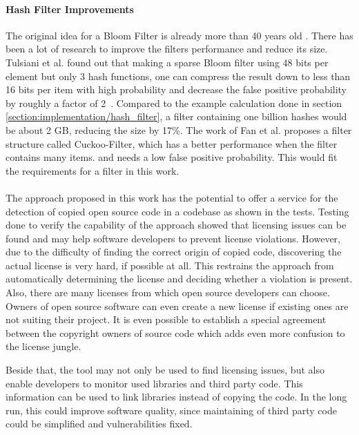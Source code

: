 \paragraph{Hash Filter Improvements}
The original idea for a Bloom Filter is already more than 40 years old \cite{bloom1970filter}.
There has been a lot of research to improve the filters performance and reduce its size.
Tulsiani et al. found out that \glqq making a sparse Bloom filter using 48 bits per element but only 3 hash functions, one can compress the result down to less than 16 bits per item with high probability and decrease the false positive probability by roughly a factor of 2\grqq \ \cite{tulsiani2013probability}.
Compared to the example calculation done in section \ref{section:implementation/hash_filter}, a filter containing one billion hashes would be about 2 GB, reducing the size by 17\%.
The work of Fan et al. proposes a filter structure called Cuckoo-Filter, which has a better performance when the filter contains many items. and needs a low false positive probability.
This would fit the requirements for a filter in this work.\\
\\
The approach proposed in this work has the potential to offer a service for the detection of copied open source code in a codebase as shown in the tests.
Testing done to verify the capability of the approach showed that licensing issues can be found and may help software developers to prevent license violations.
However, due to the difficulty of finding the correct origin of copied code, discovering the actual license is very hard, if possible at all.
This restrains the approach from automatically determining the license and deciding whether a violation is present.
Also, there are many licenses from which open source developers can choose.
Owners of open source software can even create a new license if existing ones are not suiting their project.
It is even possible to establish a special agreement between the copyright owners of source code which adds even more confusion to the license jungle.

Beside that, the tool may not only be used to find licensing issues, but also enable developers to monitor used libraries and third party code.
This information can be used to link libraries instead of copying the code.
In the long run, this could improve software quality, since maintaining of third party code could be simplified and vulnerabilities fixed.

